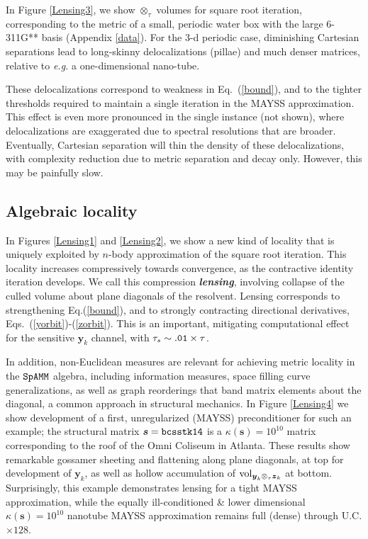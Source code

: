 \documentclass[letterpaper,twocolumn,amsmath,amsfont,amssymb,english,aps,jcp,preprintnumbers,groupaddress,nofootinbib,tightenlines,floatfix]{revtex4}
\newcommand{\mat}[1]{\boldsymbol{#1}}
\newcommand{\ot}{  {\scriptstyle \otimes}_{ \tau } }
\theoremstyle{plain}
\theoremstyle{remark}
\theoremstyle{plain}
\begin{document}

In Figure \ref{Lensing3}, we show $\ot$ volumes for square root iteration, corresponding to the metric of a small, periodic water box 
with the large 6-311G** basis (Appendix \ref{data}).  
For the 3-d periodic case, diminishing Cartesian separations lead to long-skinny delocalizations (pillae)
and much denser matrices, relative to {\em e.g.} a one-dimensional nano-tube.  

These delocalizations correspond to weakness in Eq.~(\ref{bound}),  
and to the tighter thresholds required to maintain a single iteration in the MAYSS approximation.  This effect is even more pronounced in the 
single instance (not shown), where delocalizations are exaggerated due to spectral resolutions that are broader.  
Eventually, Cartesian separation will thin the density of these delocalizations,  
with complexity reduction due to metric separation and decay only.  However, this may be painfully slow.  

\subsection{Algebraic locality}

In Figures \ref{Lensing1} and \ref{Lensing2},  we show a new kind of locality that is uniquely exploited by $n$-body approximation 
of the square root iteration.  This locality increases compressively towards convergence, 
as the contractive identity iteration develops.  
We call this compression {\bf  \em lensing},  involving collapse  of the culled volume about plane diagonals of the resolvent.
Lensing corresponds to strengthening Eq.(\ref{bound}), 
and to strongly contracting directional derivatives, Eqs.~(\ref{yorbit})-(\ref{zorbit}).
This is an important, mitigating computational effect for the sensitive $\mat{y}_k$ channel, 
with $\tau_s \sim {\tt .01} \times \tau$. 

In addition, non-Euclidean measures are relevant for achieving metric locality in 
the $\tt SpAMM$ algebra, including information measures, space filling curve generalizations, as well 
as graph reorderings that band matrix elements about the diagonal, a common approach in 
structural mechanics.   In Figure \ref{Lensing4} we show development of a first, unregularized (MAYSS) 
preconditioner for such an example; the structural matrix $\mat{s}={\tt bcsstk14}$ is a $\kappa(\mat{s})=10^{10}$ matrix 
corresponding to the roof of the Omni Coliseum in Atlanta.  These results show remarkable 
gossamer sheeting and flattening along plane diagonals, at top for development of $\mat{y}_k$, 
as well as hollow accumulation of ${\rm vol}_{\mat{y}_k \ot \mat{z}_k}$ at bottom.
Surprisingly, this example demonstrates lensing for a tight MAYSS approximation, while the 
equally ill-conditioned \& lower dimensional  $\kappa (\mat{s})=10^{10}$ nanotube MAYSS approximation 
remains full (dense) through U.C. $\times 128$.
\end{document}
